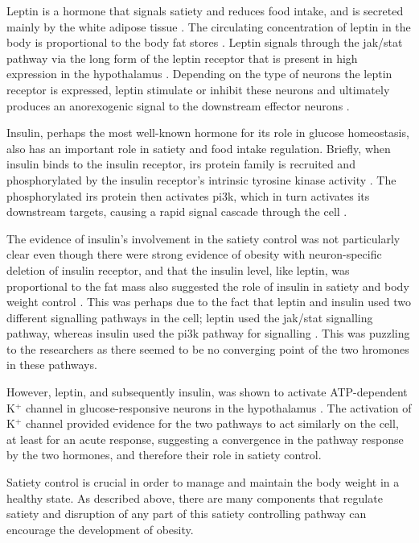 Leptin is a hormone that signals satiety and reduces food intake, and is secreted mainly by the white adipose tissue \citep{Moustafa2013,Zhang1994}.
The circulating concentration of leptin in the body is proportional to the body fat stores \citep{Barsh2002, Moustafa2013}.
Leptin signals through the \gls{jak}/\gls{stat} pathway via the long form of the leptin receptor that is present in high expression in the hypothalamus \citep{Ghilardi1996,Lee1996}.
Depending on the type of neurons the leptin receptor is expressed, leptin stimulate or inhibit these neurons and ultimately produces an anorexogenic signal to the downstream effector neurons \citep{Bell2005}.

Insulin, perhaps the most well-known hormone for its role in glucose homeostasis, also has an important role in satiety and food intake regulation.
Briefly, when insulin binds to the insulin receptor, \gls{irs} protein family is recruited and phosphorylated by the insulin receptor's intrinsic tyrosine kinase activity \citep{Saltiel2002}.
The phosphorylated \gls{irs} protein then activates \gls{pi3k}, which in turn activates its downstream targets, causing a rapid signal cascade through the cell \citep{Saltiel2002}.

The evidence of insulin's involvement in the satiety control was not particularly clear even though there were strong evidence of obesity with neuron-specific deletion of insulin receptor, and that the insulin level, like leptin, was proportional to the fat mass also suggested the role of insulin in satiety and body weight control \citep{Barsh2002, Bruning2000, Woods1979}.
This was perhaps due to the fact that leptin and insulin used two different signalling pathways in the cell; leptin used the \gls{jak}/\gls{stat} signalling pathway, whereas insulin used the \gls{pi3k} pathway for signalling \citep{Ghilardi1996}.
This was puzzling to the researchers as there seemed to be no converging point of the two hromones in these pathways.

However, leptin, and subsequently insulin, was shown to activate ATP-dep\-endent K$^+$ channel in glucose-responsive neurons in the hypothalamus \citep{Spanswick1997, Spanswick2000}.
The activation of K$^+$ channel provided evidence for the two pathways to act similarly on the cell, at least for an acute response, suggesting a convergence in the pathway response by the two hormones, and therefore their role in satiety control.

Satiety control is crucial in order to manage  and maintain the body weight in a healthy state.
As described above, there are many components that regulate satiety and disruption of any part of this satiety controlling pathway can encourage the development of obesity.

